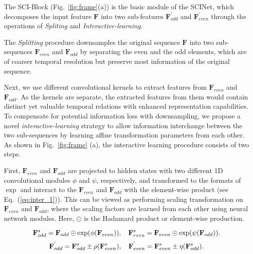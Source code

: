 \documentclass{article}
\begin{document}
The SCI-Block (Fig.~\ref{fig:frame}(a)) is the basic module of the SCINet, which decomposes the input feature $\mathbf{F}$ into two sub-features $\mathbf{F}^{'}_{odd}$ and $\mathbf{F}^{'}_{even}$ through the operations of \emph{Spliting} and \emph{Interactive-learning}. 


The \textit{Splitting} procedure downsamples the original sequence $\mathbf{F}$ into two sub-sequences $\mathbf{F}_{even}$ and $\mathbf{F}_{odd}$ by separating the even and the odd elements, which are of coarser temporal resolution but preserve most information of the original sequence.

Next, we use different convolutional kernels to extract features from $\mathbf{F}_{even}$ and $\mathbf{F}_{odd}$. As the kernels are separate, the extracted features from them would contain distinct yet valuable temporal relations with enhanced representation capabilities.
To compensate for potential information loss with downsampling, 
we propose a novel \emph{interactive-learning} strategy to allow information interchange between the two sub-sequences by learning affine transformation parameters from each other. 
As shown in Fig.~\ref{fig:frame} (a), the interactive learning procedure consists of two steps. 


First, $\mathbf{F}_{even}$ and $\mathbf{F}_{odd}$ are projected to hidden states with two different 1D convolutional modules $\phi$ and $\psi$, respectively, and transformed to the formats of $\exp$ and interact to the $\mathbf{F}_{even}$ and $\mathbf{F}_{odd}$ with the element-wise product (see Eq.~(\ref{eq:inter_1})). 
This can be viewed as performing scaling transformation on $\mathbf{F}_{even}$ and $\mathbf{F}_{odd}$, where the scaling factors are learned from each other using neural network modules.
Here, $\odot$ is the Hadamard product or element-wise production.

\vspace{-10pt}
\begin{equation}\label{eq:inter_1}
\small
    \mathbf{F}^{s}_{odd} = \mathbf{F}_{odd}\odot   \exp(\phi (\mathbf{F}_{even}) ),~~~
    \mathbf{F}^{s}_{even} = \mathbf{F}_{even}\odot \exp(\psi (\mathbf{F}_{odd}) ).
\end{equation}
\vspace{-10pt}
\begin{equation}\label{eq:inter_2}
\small
    \mathbf{F}^{'}_{odd} = \mathbf{F}^{s}_{odd} \pm  \rho( \mathbf{F}^{s}_{even}),~~~
    \mathbf{F}^{'}_{even} = \mathbf{F}^{s}_{even} \pm   \eta(\mathbf{F}^{s}_{odd}).
\end{equation}
\end{document}
